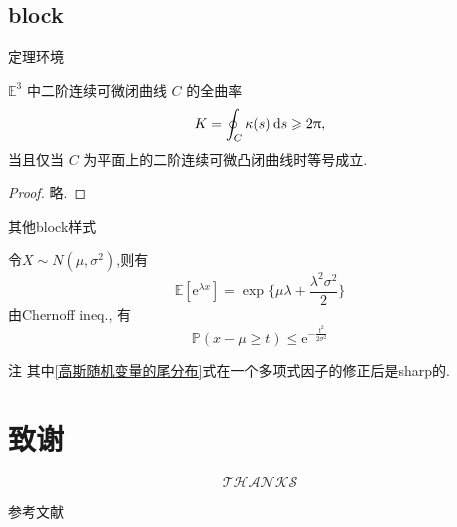 \documentclass{bnuslides}
\begin{document}
\subsection{block}
\begin{frame}{定理环境}
	\begin{theorem}[Fenchel定理]
		$\mathbb{E}^3$ 中二阶连续可微闭曲线 $C$ 的全曲率
		$$
			K = \oint_C \kappa(s) \dif s \geqslant 2 \uppi,
		$$
		当且仅当 $C$ 为平面上的二阶连续可微凸闭曲线时等号成立.
	\end{theorem}
	\begin{proof}
		略.
	\end{proof}

\end{frame}
\begin{frame}{其他block样式}
	\begin{example}[高斯随机变量的尾分布]
		令$X\sim N(\mu,\sigma^2)$,则有
		\begin{equation}
			\mathbb{E}[\mathrm{e}^{\lambda x}]= \exp{\{\mu \lambda + \frac{\lambda^2\sigma^2}{2}\}}
		\end{equation}
		由Chernoff ineq\cite{einstein1905}\cite{knuth1984}., 有
		\begin{equation}
			\mathbb{P}(x-\mu \geqslant t) \leqslant \mathrm{e}^{-\frac{t^2}{2\sigma^2}}
			\label{高斯随机变量的尾分布}
		\end{equation}
	\end{example}
	\begin{alertblock}{注}
		其中\eqref{高斯随机变量的尾分布}式在一个多项式因子的修正后是sharp的\cite{lamport1994}.
	\end{alertblock}
\end{frame}

\appendix
\section{致谢}
\begin{frame}
	\Huge
	$$
		\mathscr{THANKS}
	$$
\end{frame}

\begin{frame}[allowframebreaks]{参考文献}
	
	
\end{frame}
\end{document}
